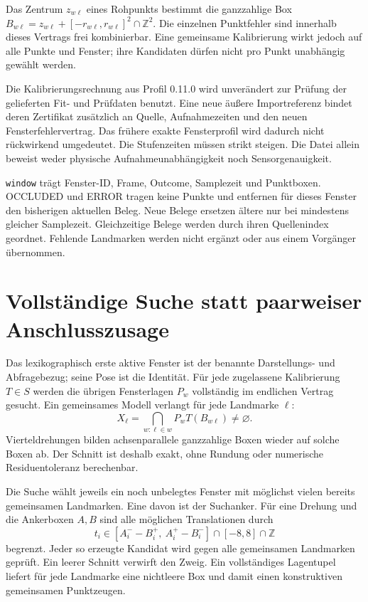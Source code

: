 \documentclass[11pt,a4paper]{article}
\newcommand{\nextsection}[2]{\clearpage{\color{accent}\small\textsf{#1}}\section{#2}}
\begin{document}
Das Zentrum $z_{w\ell}$ eines Rohpunkts bestimmt die ganzzahlige
Box $B_{w\ell}=z_{w\ell}+[-r_{w\ell},r_{w\ell}]^2\cap\mathbb Z^2$.
Die einzelnen Punktfehler sind innerhalb dieses Vertrags frei
kombinierbar. Eine gemeinsame Kalibrierung wirkt jedoch auf alle
Punkte und Fenster; ihre Kandidaten dürfen nicht pro Punkt
unabhängig gewählt werden.

Die Kalibrierungsrechnung aus Profil 0.11.0 wird unverändert zur
Prüfung der gelieferten Fit- und Prüfdaten benutzt. Eine neue äußere
Importreferenz bindet deren Zertifikat zusätzlich an Quelle,
Aufnahmezeiten und den neuen Fensterfehlervertrag. Das frühere
exakte Fensterprofil wird dadurch nicht rückwirkend umgedeutet.
Die Stufenzeiten müssen strikt steigen. Die Datei allein beweist
weder physische Aufnahmeunabhängigkeit noch Sensorgenauigkeit.

\texttt{window} trägt Fenster-ID, Frame, Outcome, Samplezeit und
Punktboxen. OCCLUDED und ERROR tragen keine Punkte und entfernen
für dieses Fenster den bisherigen aktuellen Beleg. Neue Belege
ersetzen ältere nur bei mindestens gleicher Samplezeit. Gleichzeitige
Belege werden durch ihren Quellenindex geordnet. Fehlende
Landmarken werden nicht ergänzt oder aus einem Vorgänger übernommen.

\nextsection{67 / GEMEINSAME GEOMETRIE}{Vollständige Suche statt paarweiser Anschlusszusage}
Das lexikographisch erste aktive Fenster ist der benannte
Darstellungs- und Abfragebezug; seine Pose ist die Identität.
Für jede zugelassene Kalibrierung $T\in S$ werden die übrigen
Fensterlagen $P_w$ vollständig im endlichen Vertrag gesucht.
Ein gemeinsames Modell verlangt für jede Landmarke $\ell$:
\[
 X_\ell=\bigcap_{w:\ell\in w}P_wT(B_{w\ell})\ne\varnothing.
\]
Vierteldrehungen bilden achsenparallele ganzzahlige Boxen wieder
auf solche Boxen ab. Der Schnitt ist deshalb exakt, ohne
Rundung oder numerische Residuentoleranz berechenbar.

Die Suche wählt jeweils ein noch unbelegtes Fenster mit möglichst
vielen bereits gemeinsamen Landmarken. Eine davon ist der
Suchanker. Für eine Drehung und die Ankerboxen $A,B$ sind alle
möglichen Translationen durch
\[
 t_i\in[A_i^- - B_i^+,\ A_i^+ - B_i^-]\cap[-8,8]\cap\mathbb Z
\]
begrenzt. Jeder so erzeugte Kandidat wird gegen alle gemeinsamen
Landmarken geprüft. Ein leerer Schnitt verwirft den Zweig. Ein
vollständiges Lagentupel liefert für jede Landmarke eine nichtleere
Box und damit einen konstruktiven gemeinsamen Punktzeugen.
\end{document}
